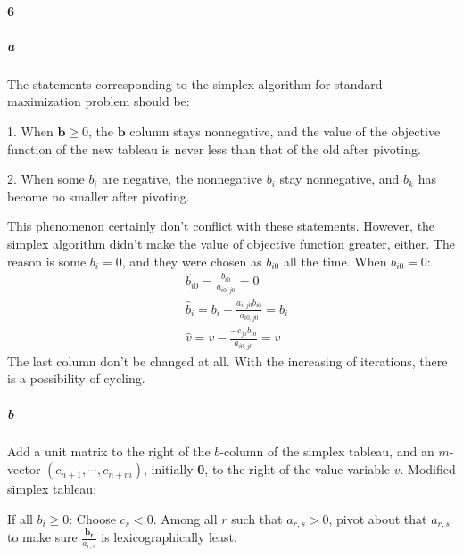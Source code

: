 \documentclass[22pt]{article}
\begin{document}
	\paragraph{6}
		\subparagraph{a}The statements corresponding to the simplex algorithm for standard maximization problem should be: 

		1. When $\mathbf{b} \geq 0$, the $\mathbf{b}$ column stays nonnegative, and the value of the objective function of the new tableau is never less than that of the old after pivoting.

		2. When some $b_i$ are negative, the nonnegative $b_i$ stay nonnegative, and $b_k$ has become no smaller after pivoting.

		This phenomenon certainly don't conflict with these statements. However, the simplex algorithm didn't make the value of objective function greater, either. The reason is some $b_i = 0$, and they were chosen as $b_{i0}$ all the time. When $b_{i0} = 0$:
		\begin{align}
			&\hat{b}_{i0} = \frac{b_{i0}}{a_{i0,j0}} = 0\\
			&\hat{b}_i = b_i-\frac{a_{i,j0}b_{i0}}{a_{i0,j0}} = b_i\\
			&\hat{v} = v - \frac{-c_{j0}b_{i0}}{a_{i0,j0}} = v
		\end{align}
		The last column don't be changed at all. With the increasing of iterations, there is a possibility of cycling.


		\subparagraph{b}Add a unit matrix to the right of the $b$-column of the simplex tableau, and an $m$-vector $(c_{n+1}, \cdots, c_{n+m})$, initially \textbf{0}, to the right of the value variable $v$. Modified simplex tableau:
		\begin{figure}[H]
				\centering
			\end{figure}
		 If all $b_i \geq 0$: Choose $c_s < 0$. Among all $r$ such that $a_{r,s} > 0$, pivot about that $a_{r,s}$ to make sure $\frac{\mathbf{b_r}}{a_{r,s}}$ is lexicographically least.
\end{document}
